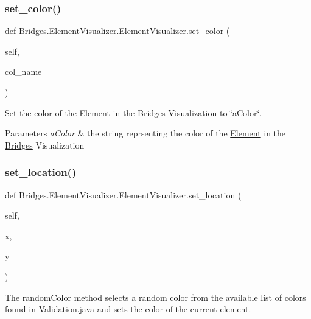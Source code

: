 \subsubsection{\texorpdfstring{set\+\_\+color()}{set\_color()}}
{\footnotesize\ttfamily def Bridges.\+Element\+Visualizer.\+Element\+Visualizer.\+set\+\_\+color (\begin{DoxyParamCaption}\item[{}]{self,  }\item[{}]{col\+\_\+name }\end{DoxyParamCaption})}



Set the color of the \mbox{\hyperlink{namespace_bridges_1_1_element}{Element}} in the \mbox{\hyperlink{namespace_bridges_1_1_bridges}{Bridges}} Visualization to \char`\"{}a\+Color\char`\"{}. 


\begin{DoxyParams}{Parameters}
{\em a\+Color} & the string reprsenting the color of the \mbox{\hyperlink{namespace_bridges_1_1_element}{Element}} in the \mbox{\hyperlink{namespace_bridges_1_1_bridges}{Bridges}} Visualization \\
\hline
\end{DoxyParams}
\mbox{\label{class_bridges_1_1_element_visualizer_1_1_element_visualizer_af3ed5e44884f0a02161cd97c77a4ee9c}} 
\subsubsection{\texorpdfstring{set\+\_\+location()}{set\_location()}}
{\footnotesize\ttfamily def Bridges.\+Element\+Visualizer.\+Element\+Visualizer.\+set\+\_\+location (\begin{DoxyParamCaption}\item[{}]{self,  }\item[{}]{x,  }\item[{}]{y }\end{DoxyParamCaption})}



The random\+Color method selects a random color from the available list of colors found in Validation.\+java and sets the color of the current element. 

